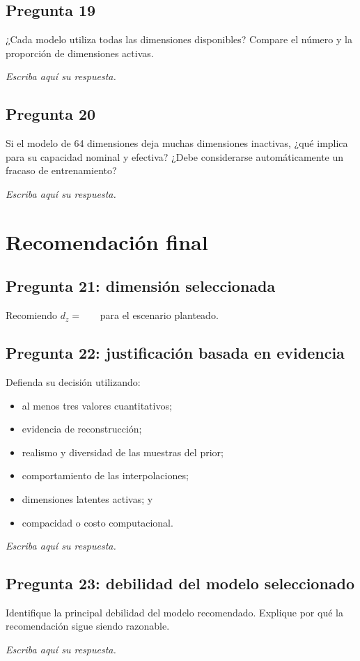 \documentclass[11pt,letterpaper]{article}
\newcommand{\answerarea}[1][2.1cm]{%
\begin{responsebox}
\textit{Escriba aquí su respuesta.}
\vspace{#1}
\end{responsebox}
}
\begin{document}
\subsection*{Pregunta 19}
¿Cada modelo utiliza todas las dimensiones disponibles? Compare el número y la
proporción de dimensiones activas.
\answerarea[2.7cm]

\subsection*{Pregunta 20}
Si el modelo de 64 dimensiones deja muchas dimensiones inactivas, ¿qué implica
para su capacidad nominal y efectiva? ¿Debe considerarse automáticamente un
fracaso de entrenamiento?
\answerarea[3.2cm]

\section{Recomendación final}

\subsection*{Pregunta 21: dimensión seleccionada}
\begin{center}
\Large Recomiendo $d_z=\boxed{\phantom{000}}$ para el escenario planteado.
\end{center}

\subsection*{Pregunta 22: justificación basada en evidencia}
Defienda su decisión utilizando:
\begin{itemize}[leftmargin=*]
  \item al menos tres valores cuantitativos;
  \item evidencia de reconstrucción;
  \item realismo y diversidad de las muestras del prior;
  \item comportamiento de las interpolaciones;
  \item dimensiones latentes activas; y
  \item compacidad o costo computacional.
\end{itemize}
\answerarea[7.0cm]

\subsection*{Pregunta 23: debilidad del modelo seleccionado}
Identifique la principal debilidad del modelo recomendado. Explique por qué la
recomendación sigue siendo razonable.
\answerarea[3.2cm]
\end{document}
